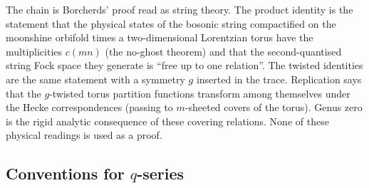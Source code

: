 \begin{physics}
The chain is Borcherds' proof read as string theory.  The product identity is the statement that the physical states
of the bosonic string compactified on the moonshine orbifold times a two-dimensional Lorentzian torus have the
multiplicities $c(mn)$ (the no-ghost theorem) and that the second-quantised string Fock space they generate is
``free up to one relation''.  The twisted identities are the same statement with a symmetry $g$ inserted in the trace.
Replication says that the $g$-twisted torus partition functions transform among themselves under the Hecke
correspondences (passing to $m$-sheeted covers of the torus).  Genus zero is the rigid analytic consequence of these
covering relations.  None of these physical readings is used as a proof.
\end{physics}

\subsection{Conventions for \texorpdfstring{$q$}{q}-series}\label{ch19:sec:qconv}

